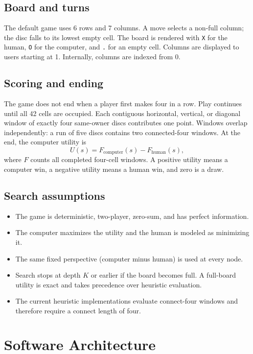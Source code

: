 \documentclass[11pt,a4paper]{article}
\begin{document}
\subsection{Board and turns}
The default game uses 6 rows and 7 columns. A move selects a non-full column;
the disc falls to its lowest empty cell. The board is rendered with \texttt{X}
for the human, \texttt{O} for the computer, and \texttt{.} for an empty cell.
Columns are displayed to users starting at 1. Internally, columns are indexed
from 0.

\subsection{Scoring and ending}
The game does not end when a player first makes four in a row. Play continues
until all 42 cells are occupied. Each contiguous horizontal, vertical, or
diagonal window of exactly four same-owner discs contributes one point. Windows
overlap independently: a run of five discs contains two connected-four windows.
At the end, the computer utility is
\[
  U(s)=F_{\mathrm{computer}}(s)-F_{\mathrm{human}}(s),
\]
where $F$ counts all completed four-cell windows. A positive utility means a
computer win, a negative utility means a human win, and zero is a draw.

\subsection{Search assumptions}
\begin{itemize}
  \item The game is deterministic, two-player, zero-sum, and has perfect information.
  \item The computer maximizes the utility and the human is modeled as minimizing it.
  \item The same fixed perspective (computer minus human) is used at every node.
  \item Search stops at depth $K$ or earlier if the board becomes full. A full-board
        utility is exact and takes precedence over heuristic evaluation.
  \item The current heuristic implementations evaluate connect-four windows and
        therefore require a connect length of four.
\end{itemize}

\section{Software Architecture}
\end{document}
